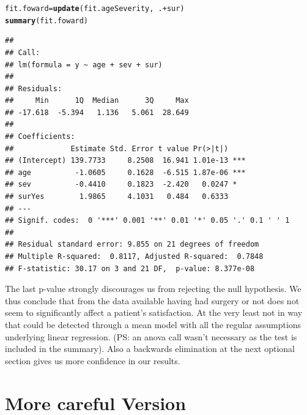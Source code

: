 \documentclass{article}\usepackage[]{graphicx}\usepackage[]{color}
\makeatletter
\newcommand{\hlopt}[1]{\textcolor[rgb]{0,0,0}{#1}}%
\newcommand{\hlstd}[1]{\textcolor[rgb]{0.345,0.345,0.345}{#1}}%
\newcommand{\hlkwb}[1]{\textcolor[rgb]{0.69,0.353,0.396}{#1}}%
\newcommand{\hlkwd}[1]{\textcolor[rgb]{0.737,0.353,0.396}{\textbf{#1}}}%
\newenvironment{kframe}{%
 \def\at@end@of@kframe{}%
 \ifinner\ifhmode%
  \def\at@end@of@kframe{\end{minipage}}%
  \begin{minipage}{\columnwidth}%
 \fi\fi%
 \def\FrameCommand##1{\hskip\@totalleftmargin \hskip-\fboxsep
 \colorbox{shadecolor}{##1}\hskip-\fboxsep
     \hskip-\linewidth \hskip-\@totalleftmargin \hskip\columnwidth}%
 \MakeFramed {\advance\hsize-\width
   \@totalleftmargin\z@ \linewidth\hsize
   \@setminipage}}%
 {\par\unskip\endMakeFramed%
 \at@end@of@kframe}
\newenvironment{knitrout}{}{} %
\makeatother
\begin{document}
\clearpage
\begin{knitrout}
\color{fgcolor}\begin{kframe}
\begin{alltt}
\hlstd{fit.foward} \hlkwb{=} \hlkwd{update}\hlstd{(fit.ageSeverity,} \hlopt{~}\hlstd{.} \hlopt{+} \hlstd{sur)}
\hlkwd{summary}\hlstd{(fit.foward)}
\end{alltt}
\begin{verbatim}
## 
## Call:
## lm(formula = y ~ age + sev + sur)
## 
## Residuals:
##     Min      1Q  Median      3Q     Max 
## -17.618  -5.394   1.136   5.061  28.649 
## 
## Coefficients:
##             Estimate Std. Error t value Pr(>|t|)    
## (Intercept) 139.7733     8.2508  16.941 1.01e-13 ***
## age          -1.0605     0.1628  -6.515 1.87e-06 ***
## sev          -0.4410     0.1823  -2.420   0.0247 *  
## surYes        1.9865     4.1031   0.484   0.6333    
## ---
## Signif. codes:  0 '***' 0.001 '**' 0.01 '*' 0.05 '.' 0.1 ' ' 1
## 
## Residual standard error: 9.855 on 21 degrees of freedom
## Multiple R-squared:  0.8117,	Adjusted R-squared:  0.7848 
## F-statistic: 30.17 on 3 and 21 DF,  p-value: 8.377e-08
\end{verbatim}
\end{kframe}
\end{knitrout}
The last p-value strongly discourages us from rejecting the null hypothesis. We thus conclude that from the data available having had surgery or not does not seem to significantly affect a patient's satisfaction. At the very least not in way that could be detected through a mean model with all the regular assumptions underlying linear regression. (PS: an anova call wasn't necessary as the test is included in the summary). Also a backwards elimination at the next optional section gives us more confidence in our results.

\clearpage

\section*{More careful Version}
\end{document}

